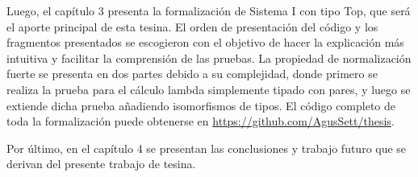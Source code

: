 Luego, el capítulo 3 presenta la formalización de Sistema I con tipo Top, que será el aporte principal de esta tesina.
El orden de presentación del código y los fragmentos presentados se escogieron con el objetivo de hacer la explicación más intuitiva y facilitar la comprensión de las pruebas.
La propiedad de normalización fuerte se presenta en dos partes debido a su complejidad, donde primero se realiza la prueba para el cálculo lambda simplemente tipado con pares, y luego se extiende dicha prueba añadiendo isomorfismos de tipos.
El código completo de toda la formalización puede obtenerse en \url{https://github.com/AgusSett/thesis}.

Por último, en el capítulo 4 se presentan las conclusiones y trabajo futuro que se derivan del presente trabajo de tesina.